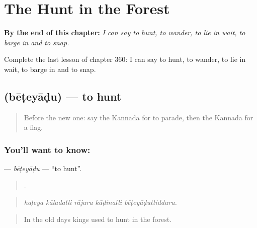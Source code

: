 
\chapter{The Hunt in the Forest}
\label{ch:ka-the-hunt-in-the-forest}

\begin{chapteropening}
\textbf{By the end of this chapter:} \emph{I can say to hunt, to wander, to lie in wait, to barge in and to snap.}

Complete the last lesson of chapter 360: I can say to hunt, to wander, to lie in wait, to barge in and to snap.
\end{chapteropening}

\section[\texorpdfstring{\kn{ಬೇಟೆಯಾಡು} (bēṭeyāḍu)}{ಬೇಟೆಯಾಡು (bēṭeyāḍu)}]{ (bēṭeyāḍu) — to hunt}

\label{lesson:KA-C360-beteyadu}



\begin{quote}
Before the new one: say the Kannada for to parade, then the Kannada for a flag.
\end{quote}

\subsection*{You'll want to know: }
\textbf{} — \emph{bēṭeyāḍu} — \textquotedblleft{}to hunt\textquotedblright{}.

\begin{quote}
    .
\end{quote}

\begin{quote}
\emph{haḷeya kāladalli rājaru kāḍinalli bēṭeyāḍuttiddaru.}
\end{quote}

\begin{quote}
In the old days kings used to hunt in the forest.
\end{quote}

